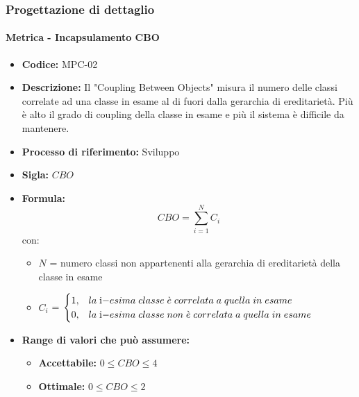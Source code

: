 \subsubsection{Progettazione di dettaglio}
    \paragraph{Metrica - Incapsulamento CBO}
    \begin{itemize}
        \item \textbf{Codice:} MPC-02
        \item \textbf{Descrizione:} Il "Coupling Between Objects" misura il numero delle classi correlate ad una classe in esame al di fuori dalla gerarchia di ereditarietà. Più è alto il grado di coupling della classe in esame e più il sistema è difficile da mantenere.
        \item \textbf{Processo di riferimento:} Sviluppo
        \item \textbf{Sigla:} $CBO$
        \item \textbf{Formula:} $$CBO = {\sum_{i=1}^{N} C_i}$$
        con:
        \begin{itemize}
            \item $N$ = numero classi non appartenenti alla gerarchia di ereditarietà della classe in esame
            \item $C_i$ =
            \begin{math} {
                \begin{cases}
                    1, & la \; $i$-esima \; classe \; \grave{e} \; correlata \; a \; quella \; in \; esame \\
                    0, & la \; $i$-esima \; classe \; non \; \grave{e} \; correlata \; a \; quella \; in \; esame
                \end{cases}
            }
            \end{math}
        \end{itemize}
        \item \textbf{Range di valori che può assumere:}
        \begin{itemize}
            \item \textbf{Accettabile:} $0 \leq{} CBO \leq 4$
            \item \textbf{Ottimale:} $0 \leq{} CBO \leq 2$
        \end{itemize}
    \end{itemize}

